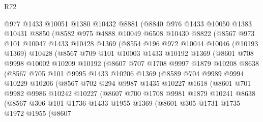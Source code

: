\begin{lexlean}{R72}
\begin{coremodule}
      @977
      @1433
      @10051
      @1380
      @10432
      @8881
      (@8840
        @976
        @1433
        @10050
        @1383
        @10431
        @8850
        (@8582
          @975
          @4888
          @10049
          @6508
          @10430
          @8822
          (@8567
            @973
            @101
            @10047
            @1433
            @10428
            @1369
            (@8554
              @196
              @972
              @10044
              @10046
              (@10193 @1369)
              @10428
              (@8567
                @709
                @101
                @10003
                @1433
                @10192
                @1369
                (@8601
                  @708
                  @9998
                  @10002
                  @10209
                  @10192
                  (@8607
                    @707
                    @1708
                    @9997
                    @1879
                    @10208
                    @8638
                    (@8567
                      @705
                      @101
                      @9995
                      @1433
                      @10206
                      @1369
                      (@8589
                        @704
                        @9989
                        @9994
                        @10229
                        @10206
                        (@8567
                          @702
                          @294
                          @9987
                          @1435
                          @10227
                          @1618
                          (@8601
                            @701
                            @9982
                            @9986
                            @10242
                            @10227
                            (@8607
                              @700
                              @1708
                              @9981
                              @1879
                              @10241
                              @8638
                              (@8567
                                @306
                                @101
                                @1736
                                @1433
                                @1955
                                @1369
                                (@8601
                                  @305
                                  @1731
                                  @1735
                                  @1972
                                  @1955
                                  (@8607

\end{coremodule}
\end{lexlean}
